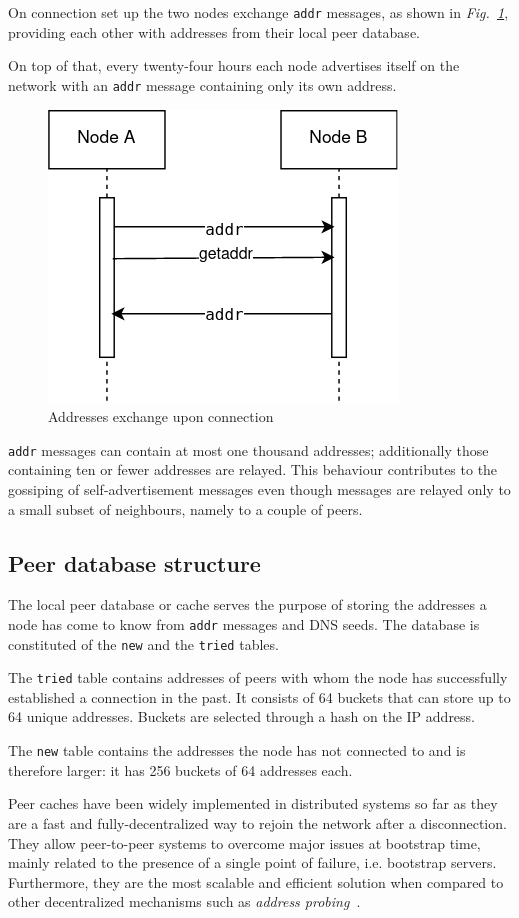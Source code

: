 \documentclass[12pt, letterpaper, twoside]{article}
\begin{document}
On connection set up the two nodes exchange \texttt{addr} messages, as shown in \emph{Fig.~\ref{fig:addr}}, providing each other with addresses from their local peer database.

On top of that, every twenty-four hours each node advertises itself on the network with an \texttt{addr} message containing only its own address.

\begin{figure}[h]
	\includegraphics[width=.45\textwidth]{pict/BTCaddr.png}
	\centering
	\caption{Addresses exchange upon connection}
	\label{fig:addr}
\end{figure}

\texttt{addr} messages can contain at most one thousand addresses; additionally those containing ten or fewer addresses are relayed. This behaviour contributes to the gossiping of self-advertisement messages even though messages are relayed only to a small subset of neighbours, namely to a couple of peers.

\subsection{Peer database structure}\label{sec:cachestruct}
The local peer database or cache serves the purpose of storing the addresses a node has come to know from \texttt{addr} messages and DNS seeds. The database is constituted of the \texttt{new} and the \texttt{tried} tables.

The \texttt{tried} table contains addresses of peers with whom the node has successfully established a connection in the past. It consists of 64 buckets that can store up to 64 unique addresses. Buckets are selected through a hash on the IP address.

The \texttt{new} table contains the addresses the node has not connected to and is therefore larger: it has 256 buckets of 64 addresses each.

Peer caches have been widely implemented in distributed systems so far as they are a fast and fully-decentralized way to rejoin the network after a disconnection. They allow peer-to-peer systems to overcome major issues at bootstrap time, mainly related to the presence of a single point of failure, i.e. bootstrap servers. Furthermore, they are the most scalable and efficient solution when compared to other decentralized mechanisms such as \textit{address probing}~\cite{decentrbootstrapp2p}.
\end{document}
